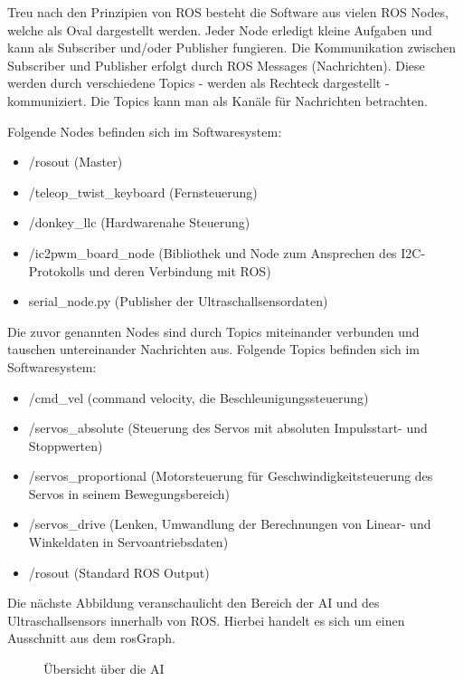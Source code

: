 \documentclass[conference]{IEEEtran}
\begin{document}
	Treu nach den Prinzipien von ROS besteht die Software aus vielen ROS Nodes, welche als Oval dargestellt werden. 
	Jeder Node erledigt kleine Aufgaben und kann als Subscriber und/oder Publisher fungieren.
	Die Kommunikation zwischen Subscriber und Publisher erfolgt durch ROS Messages (Nachrichten).
	Diese werden durch verschiedene Topics - werden als Rechteck dargestellt - kommuniziert.
	Die Topics kann man als Kanäle für Nachrichten betrachten.
	
	Folgende Nodes befinden sich im Softwaresystem:
	\begin{itemize}
		\item /rosout (Master)
		\item /teleop\_twist\_keyboard (Fernsteuerung)
		\item /donkey\_llc (Hardwarenahe Steuerung)
		\item /ic2pwm\_board\_node (Bibliothek und Node zum Ansprechen des I2C-Protokolls und deren Verbindung mit ROS)
		\item serial\_node.py (Publisher der Ultraschallsensordaten)
	\end{itemize}
	
	Die zuvor genannten Nodes sind durch Topics miteinander verbunden und tauschen untereinander Nachrichten aus.
	Folgende Topics befinden sich im Softwaresystem:
	\begin{itemize}
		\item /cmd\_vel (command velocity, die Beschleunigungssteuerung)
		\item /servos\_absolute (Steuerung des Servos mit absoluten Impulsstart- und Stoppwerten)
		\item /servos\_proportional (Motorsteuerung für Geschwindigkeitsteuerung des Servos in seinem Bewegungsbereich)
		\item /servos\_drive (Lenken, Umwandlung der Berechnungen von Linear- und Winkeldaten in Servoantriebsdaten)
		\item /rosout (Standard ROS Output)
	\end{itemize}

	Die nächste Abbildung veranschaulicht den Bereich der AI und des Ultraschallsensors innerhalb von ROS. Hierbei handelt es sich um einen Ausschnitt aus dem rosGraph.

	\begin{figure}[!ht] 
		\centering
		\def\svgwidth{11cm}
		
		\caption{Übersicht über die AI}
		\label{AI-Only}
	\end{figure}
\end{document}
